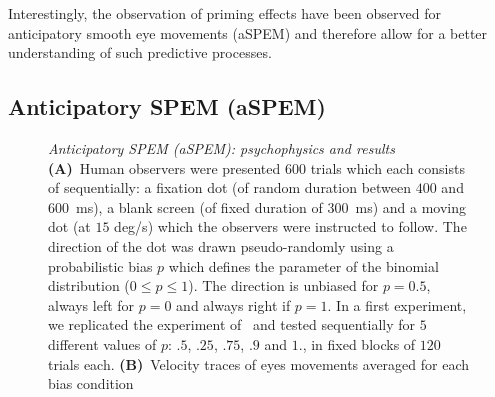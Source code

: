 \documentclass[profile,final,english, draft]{article}%
\newcommand{\ms}{\si{\milli\second}}%
\newcommand{\citep}[1]{\parencite{#1}}
\begin{document}
Interestingly, the observation of priming effects
have been observed for anticipatory smooth eye movements (aSPEM)
and therefore allow for a better understanding of such predictive processes. %
\subsection{Anticipatory SPEM (aSPEM)}
\begin{figure}%
\caption{\emph{Anticipatory SPEM (aSPEM): psychophysics and results} %
\textbf{(A)}~Human observers were presented $600$ trials %
which each consists of sequentially:
a fixation dot (of random duration between $400$ and $600$~\ms),
a blank screen (of fixed duration of  $300$~\ms) and
a moving dot (at $15$ deg/s) which the observers were instructed to follow.
The direction of the dot was drawn pseudo-randomly
using a probabilistic bias $p$ which defines the parameter
of the binomial distribution
($0\leq p\leq 1 $). The direction is unbiased for $p=0.5$,
always left for $p=0$ and always right if $p=1$.
In a first experiment,
we replicated the experiment of~\citep{Montagnini2010} and
tested sequentially for $5$ different values of $p$:
$.5$, $.25$, $.75$, $.9$ and $1.$,  
in fixed blocks of $120$ trials each.
\textbf{(B)}~Velocity traces of eyes movements 
averaged for each bias condition
}
\end{figure}
\end{document}
